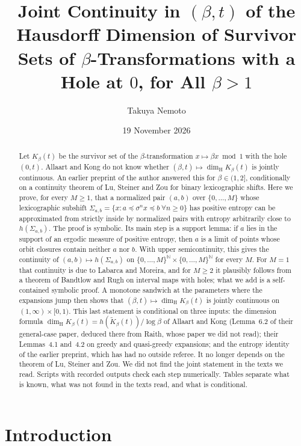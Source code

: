 \documentclass[11pt]{amsart}
\title[Joint continuity for the hole at 0, all $\beta>1$]{Joint Continuity in $(\beta,t)$ of the Hausdorff Dimension of Survivor Sets of $\beta$-Transformations with a Hole at $0$, for All $\beta>1$}
\author{Takuya Nemoto}
\date{19 November 2026}
\theoremstyle{definition}
\theoremstyle{remark}
\newcommand{\N}{\mathbb{N}}
\newcommand{\dimH}{\dim_{\mathrm H}}
\newcommand{\lex}{\preccurlyeq}
\newcommand{\K}{\tilde K}
\begin{document}
\begin{abstract}
Let $K_\beta(t)$ be the survivor set of the $\beta$-transformation $x\mapsto\beta x\bmod1$ with the hole $(0,t)$. Allaart and Kong do not know whether $(\beta,t)\mapsto\dimH K_\beta(t)$ is jointly continuous. An earlier preprint of the author answered this for $\beta\in(1,2]$, conditionally on a continuity theorem of Lu, Steiner and Zou for binary lexicographic shifts. Here we prove, for every $M\ge1$, that a normalized pair $(a,b)$ over $\{0,\dots,M\}$ whose lexicographic subshift $\Sigma_{a,b}=\{x:a\lex\sigma^nx\lex b\ \forall n\ge0\}$ has positive entropy can be approximated from strictly inside by normalized pairs with entropy arbitrarily close to $h(\Sigma_{a,b})$. The proof is symbolic. Its main step is a support lemma: if $a$ lies in the support of an ergodic measure of positive entropy, then $a$ is a limit of points whose orbit closures contain neither $a$ nor $b$. With upper semicontinuity, this gives the continuity of $(a,b)\mapsto h(\Sigma_{a,b})$ on $\{0,\dots,M\}^{\N}\times\{0,\dots,M\}^{\N}$ for every $M$. For $M=1$ that continuity is due to Labarca and Moreira, and for $M\ge2$ it plausibly follows from a theorem of Bandtlow and Rugh on interval maps with holes; what we add is a self-contained symbolic proof. A monotone sandwich at the parameters where the expansions jump then shows that $(\beta,t)\mapsto\dimH K_\beta(t)$ is jointly continuous on $(1,\infty)\times[0,1)$. This last statement is conditional on three inputs: the dimension formula $\dimH K_\beta(t)=h(\K_\beta(t))/\log\beta$ of Allaart and Kong (Lemma~6.2 of their general-case paper, deduced there from Raith, whose paper we did not read); their Lemmas~4.1 and~4.2 on greedy and quasi-greedy expansions; and the entropy identity of the earlier preprint, which has had no outside referee. It no longer depends on the theorem of Lu, Steiner and Zou. We did not find the joint statement in the texts we read. Scripts with recorded outputs check each step numerically. Tables separate what is known, what was not found in the texts read, and what is conditional.
\end{abstract}

\maketitle

\section{Introduction}
\end{document}
